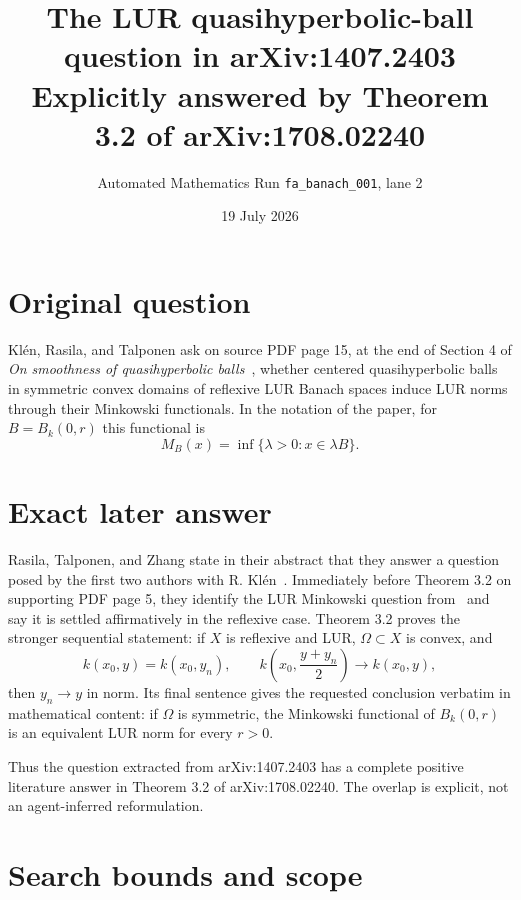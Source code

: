 \documentclass[11pt]{article}
\title{The LUR quasihyperbolic-ball question in arXiv:1407.2403\\
\large Explicitly answered by Theorem 3.2 of arXiv:1708.02240}
\author{Automated Mathematics Run \texttt{fa\_banach\_001}, lane 2}
\date{19 July 2026}
\begin{document}
\maketitle

\begin{center}
\end{center}

\section*{Original question}

Kl\'en, Rasila, and Talponen ask on source PDF page 15, at the end of
Section 4 of \emph{On smoothness of quasihyperbolic balls}~\cite{KRT}, whether
centered quasihyperbolic balls in symmetric convex domains of reflexive LUR
Banach spaces induce LUR norms through their Minkowski functionals.  In the
notation of the paper, for $B=B_k(0,r)$ this functional is
\[
 M_B(x)=\inf\{\lambda>0:x\in\lambda B\}.
\]

\section*{Exact later answer}

Rasila, Talponen, and Zhang state in their abstract that they answer a question
posed by the first two authors with R. Kl\'en~\cite{RTZ}.  Immediately before
Theorem 3.2 on supporting PDF page 5, they identify the LUR Minkowski question
from~\cite{KRT} and say it is settled affirmatively in the reflexive case.
Theorem 3.2 proves the stronger sequential statement: if $X$ is reflexive and
LUR, $\Omega\subset X$ is convex, and
\[
 k(x_0,y)=k(x_0,y_n),\qquad
 k\!\left(x_0,\frac{y+y_n}{2}\right)\longrightarrow k(x_0,y),
\]
then $y_n\to y$ in norm.  Its final sentence gives the requested conclusion
verbatim in mathematical content: if $\Omega$ is symmetric, the Minkowski
functional of $B_k(0,r)$ is an equivalent LUR norm for every $r>0$.

Thus the question extracted from arXiv:1407.2403 has a complete positive
literature answer in Theorem 3.2 of arXiv:1708.02240.  The overlap is explicit,
not an agent-inferred reformulation.

\section*{Search bounds and scope}
\end{document}
